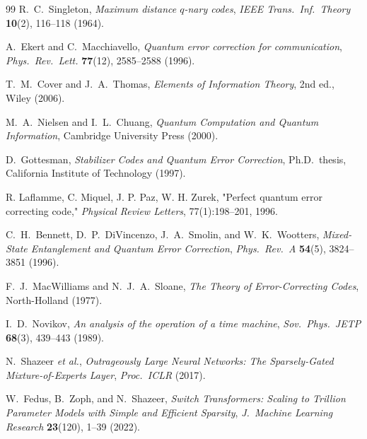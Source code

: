 \documentclass[11pt,a4paper]{article}
\begin{document}
\begin{thebibliography}{99}
R.~C.~Singleton, \emph{Maximum distance $q$-nary codes},
\emph{IEEE Trans.\ Inf.\ Theory} \textbf{10}(2), 116--118 (1964).

A.~Ekert and C.~Macchiavello, \emph{Quantum error correction for communication},
\emph{Phys.\ Rev.\ Lett.} \textbf{77}(12), 2585--2588 (1996).

T.~M.~Cover and J.~A.~Thomas, \emph{Elements of Information Theory}, 2nd ed.,
Wiley (2006).

M.~A.~Nielsen and I.~L.~Chuang, \emph{Quantum Computation and Quantum Information},
Cambridge University Press (2000).

D.~Gottesman, \emph{Stabilizer Codes and Quantum Error Correction},
Ph.D.\ thesis, California Institute of Technology (1997).

R. Laflamme, C. Miquel, J. P. Paz, W. H. Zurek, "Perfect quantum error correcting code," \textit{Physical Review Letters}, 77(1):198–201, 1996. 

C.~H.~Bennett, D.~P.~DiVincenzo, J.~A.~Smolin, and W.~K.~Wootters, \emph{Mixed-State Entanglement and Quantum Error Correction},
\emph{Phys.\ Rev.\ A} \textbf{54}(5), 3824--3851 (1996).

F.~J.~MacWilliams and N.~J.~A.~Sloane, \emph{The Theory of Error-Correcting Codes},
North-Holland (1977).

I.~D.~Novikov, \emph{An analysis of the operation of a time machine},
\emph{Sov.\ Phys.\ JETP} \textbf{68}(3), 439--443 (1989).

N.~Shazeer \textit{et al.}, \emph{Outrageously Large Neural Networks: The Sparsely-Gated Mixture-of-Experts Layer},
\emph{Proc.\ ICLR} (2017).

W.~Fedus, B.~Zoph, and N.~Shazeer, \emph{Switch Transformers: Scaling to Trillion Parameter Models with Simple and Efficient Sparsity},
\emph{J.\ Machine Learning Research} \textbf{23}(120), 1--39 (2022).

\end{thebibliography}
\end{document}

